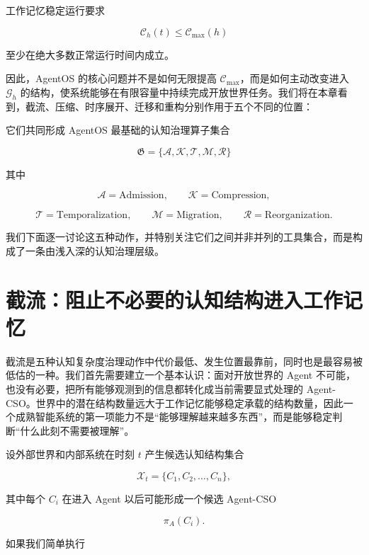 工作记忆稳定运行要求

\[
\boxed{
\mathcal C_h(t)
\leq
\mathcal C_{\max}(h)
}
\]

至少在绝大多数正常运行时间内成立。

因此，AgentOS 的核心问题并不是如何无限提高 $\mathcal C_{\max}$，而是如何主动改变进入 $\mathcal G_h$ 的结构，使系统能够在有限容量中持续完成开放世界任务。我们将在本章看到，截流、压缩、时序展开、迁移和重构分别作用于五个不同的位置：

\begin{statementbox}
\centering
{}
\end{statementbox}

它们共同形成 AgentOS 最基础的认知治理算子集合

\[
\boxed{
\mathfrak G
=
\{
\mathcal A,
\mathcal K,
\mathcal T,
\mathcal M,
\mathcal R
\}
}
\]

其中

\[
\mathcal A
=
\text{Admission},
\qquad
\mathcal K
=
\text{Compression},
\]

\[
\mathcal T
=
\text{Temporalization},
\qquad
\mathcal M
=
\text{Migration},
\qquad
\mathcal R
=
\text{Reorganization}.
\]

我们下面逐一讨论这五种动作，并特别关注它们之间并非并列的工具集合，而是构成了一条由浅入深的认知治理层级。

\section{截流：阻止不必要的认知结构进入工作记忆}

截流是五种认知复杂度治理动作中代价最低、发生位置最靠前，同时也是最容易被低估的一种。我们首先需要建立一个基本认识：面对开放世界的 Agent 不可能，也没有必要，把所有能够观测到的信息都转化成当前需要显式处理的 Agent-CSO。世界中的潜在结构数量远大于工作记忆能够稳定承载的结构数量，因此一个成熟智能系统的第一项能力不是“能够理解越来越多东西”，而是能够稳定判断“什么此刻不需要被理解”。

设外部世界和内部系统在时刻 $t$ 产生候选认知结构集合

\[
\mathcal X_t
=
\{
C_1,C_2,\ldots,C_n
\},
\]

其中每个 $C_i$ 在进入 Agent 以后可能形成一个候选 Agent-CSO

\[
\pi_A(C_i).
\]

如果我们简单执行

